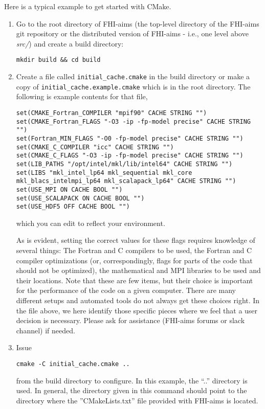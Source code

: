Here is a typical example to get started with CMake.
\begin{enumerate}
\item Go to the root directory of FHI-aims (the top-level directory
  of the FHI-aims git repository or the distributed version of
  FHI-aims - i.e., one level above \emph{src/}) and create a build directory:
\begin{verbatim}
mkdir build && cd build
\end{verbatim}
\item Create a file called \texttt{initial\_cache.cmake} in the build directory or make a copy of \texttt{initial\_cache.example.cmake} which is in the root directory. The following is example contents for that file,
\begin{verbatim}
set(CMAKE_Fortran_COMPILER "mpif90" CACHE STRING "")
set(CMAKE_Fortran_FLAGS "-O3 -ip -fp-model precise" CACHE STRING "")
set(Fortran_MIN_FLAGS "-O0 -fp-model precise" CACHE STRING "")
set(CMAKE_C_COMPILER "icc" CACHE STRING "")
set(CMAKE_C_FLAGS "-O3 -ip -fp-model precise" CACHE STRING "")
set(LIB_PATHS "/opt/intel/mkl/lib/intel64" CACHE STRING "")
set(LIBS "mkl_intel_lp64 mkl_sequential mkl_core
mkl_blacs_intelmpi_lp64 mkl_scalapack_lp64" CACHE STRING "")
set(USE_MPI ON CACHE BOOL "")
set(USE_SCALAPACK ON CACHE BOOL "")
set(USE_HDF5 OFF CACHE BOOL "")
\end{verbatim}
which you can edit to reflect your environment.

As is evident,
  setting the correct values for these flags requires knowledge of
  several things: The Fortran and C compilers to be used, the Fortran
  and C compiler optimizations (or, correspondingly, flags for parts of the
  code that should not be optimized), the mathematical and MPI
  libraries to be used and their locations. Note that these are few
  items, but their choice is important for the performance of the code
  on a given computer. There are many different setups and automated
  tools do not always get these choices right. In the file above, we
  here identify those specific pieces where we feel that a user
  decision is necessary. Please ask for assistance (FHI-aims forums or
  slack channel) if needed. 
\item Issue
\begin{verbatim}
cmake -C initial_cache.cmake ..
\end{verbatim}
from the build directory to configure. In this example, the ``..''
directory is used. In general, the directory given in this command
should point to the directory where the ''CMakeLists.txt''
file provided with FHI-aims is located.


\end{enumerate}

